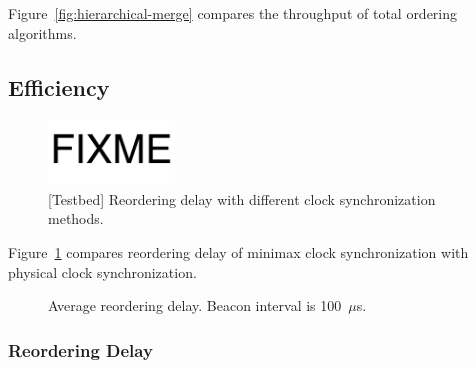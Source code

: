 Figure~\ref{fig:hierarchical-merge} compares the throughput of total ordering algorithms.


\subsection{Efficiency}
\begin{figure}[t]
\centering
\includegraphics[width=0.3\textwidth]{images/fixme.pdf}
\caption{[Testbed] Reordering delay with different clock synchronization methods.}
\label{fig:clock-sync}
\end{figure}

Figure~\ref{fig:clock-sync} compares reordering delay of minimax clock synchronization with physical clock synchronization.



\begin{figure}[t]
\centering
	\hspace{0.01\textwidth}
	\caption{Average reordering delay. Beacon interval is 100~$\mu$s.}
    \vspace{-5pt}
\label{fig:reorder-delay}
\end{figure}

\subsubsection{Reordering Delay}
\label{sec:eval-delay}

